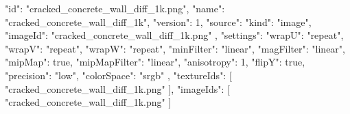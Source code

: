 {
  "id": "cracked_concrete_wall_diff_1k.png",
  "name": "cracked_concrete_wall_diff_1k",
  "version": 1,
  "source": {
    "kind": "image",
    "imageId": "cracked_concrete_wall_diff_1k.png"
  },
  "settings": {
    "wrapU": "repeat",
    "wrapV": "repeat",
    "wrapW": "repeat",
    "minFilter": "linear",
    "magFilter": "linear",
    "mipMap": true,
    "mipMapFilter": "linear",
    "anisotropy": 1,
    "flipY": true,
    "precision": "low",
    "colorSpace": "srgb"
  },
  "textureIds": [
    "cracked_concrete_wall_diff_1k.png"
  ],
  "imageIds": [
    "cracked_concrete_wall_diff_1k.png"
  ]
}
